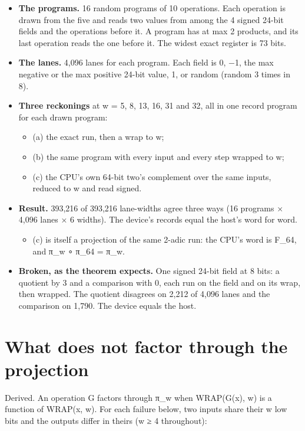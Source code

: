 \begin{itemize}
\item \textbf{The programs.} 16 random programs of 10 operations. Each operation is drawn from the five and reads two values from among the 4 signed 24-bit fields and the operations before it. A program has at max 2 products, and its last operation reads the one before it. The widest exact register is 73 bits.
\item \textbf{The lanes.} 4,096 lanes for each program. Each field is 0, −1, the max negative or the max positive 24-bit value, 1, or random (random 3 times in 8).
\item \textbf{Three reckonings} at w = 5, 8, 13, 16, 31 and 32, all in one record program for each drawn program:

\begin{itemize}
\item (a) the exact run, then a wrap to w;
\item (b) the same program with every input and every step wrapped to w;
\item (c) the CPU's own 64-bit two's complement over the same inputs, reduced to w and read signed.
\end{itemize}
\item \textbf{Result.} 393,216 of 393,216 lane-widths agree three ways (16 programs × 4,096 lanes × 6 widths). The device's records equal the host's word for word.

\begin{itemize}
\item (c) is itself a projection of the same 2-adic run: the CPU's word is F\_\allowbreak{}64, and π\_\allowbreak{}w ∘ π\_\allowbreak{}64 = π\_\allowbreak{}w.
\end{itemize}
\item \textbf{Broken, as the theorem expects.} One signed 24-bit field at 8 bits: a quotient by 3 and a comparison with 0, each run on the field and on its wrap, then wrapped. The quotient disagrees on 2,212 of 4,096 lanes and the comparison on 1,790. The device equals the host.
\end{itemize}

\section{\texorpdfstring{What does not factor through the projection}{What does not factor through the projection}}

Derived. An operation G factors through π\_\allowbreak{}w when WRAP(G(x), w) is a function of WRAP(x, w). For each failure below, two inputs share their w low bits and the outputs differ in theirs (w ≥ 4 throughout):

